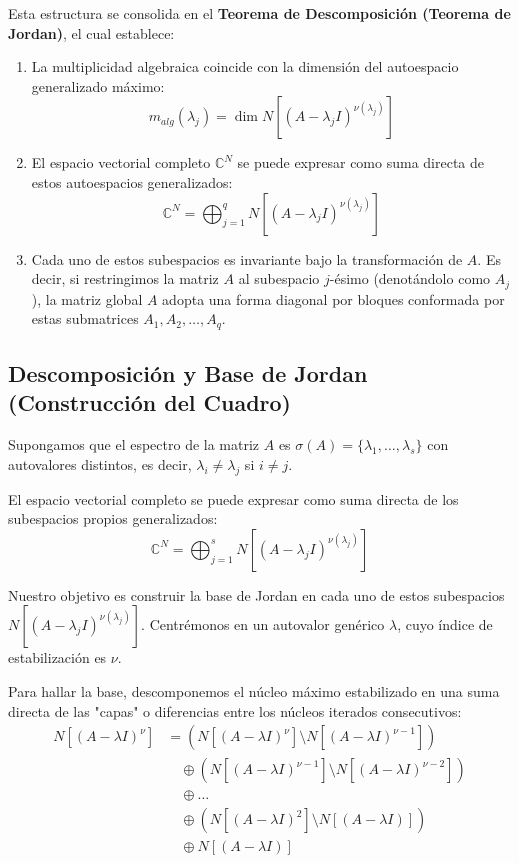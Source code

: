 Esta estructura se consolida en el \textbf{Teorema de Descomposición (Teorema de Jordan)}, el cual establece:
\begin{enumerate}
    \item La multiplicidad algebraica coincide con la dimensión del autoespacio generalizado máximo:
    \[
        m_{alg}(\lambda_j) = \dim N[(A-\lambda_j I)^{\nu(\lambda_j)}]
    \]
    
    \item El espacio vectorial completo $\mathbb{C}^N$ se puede expresar como suma directa de estos autoespacios generalizados:
    \[
        \mathbb{C}^N = \bigoplus_{j=1}^q N[(A-\lambda_j I)^{\nu(\lambda_j)}]
    \]
    
    \item Cada uno de estos subespacios es invariante bajo la transformación de $A$. Es decir, si restringimos la matriz $A$ al subespacio $j$-ésimo (denotándolo como $A_j$), la matriz global $A$ adopta una forma diagonal por bloques conformada por estas submatrices $A_1, A_2, \dots, A_q$.
\end{enumerate}
\subsection{Descomposición y Base de Jordan (Construcción del Cuadro)}

Supongamos que el espectro de la matriz $A$ es $\sigma(A)=\{\lambda_1, \dots, \lambda_s\}$ con autovalores distintos, es decir, $\lambda_i \neq \lambda_j$ si $i \neq j$. 

El espacio vectorial completo se puede expresar como suma directa de los subespacios propios generalizados:
\[
    \mathbb{C}^N = \bigoplus_{j=1}^s N[(A-\lambda_j I)^{\nu(\lambda_j)}]
\]

Nuestro objetivo es construir la base de Jordan en cada uno de estos subespacios $N[(A-\lambda_j I)^{\nu(\lambda_j)}]$. Centrémonos en un autovalor genérico $\lambda$, cuyo índice de estabilización es $\nu$.

Para hallar la base, descomponemos el núcleo máximo estabilizado en una suma directa de las "capas" o diferencias entre los núcleos iterados consecutivos:
\begin{align*}
    N[(A-\lambda I)^\nu] &= \left( N[(A-\lambda I)^\nu] \setminus N[(A-\lambda I)^{\nu-1}] \right) \\
    &\quad \oplus \left( N[(A-\lambda I)^{\nu-1}] \setminus N[(A-\lambda I)^{\nu-2}] \right) \\
    &\quad \oplus \dots \\
    &\quad \oplus \left( N[(A-\lambda I)^2] \setminus N[(A-\lambda I)] \right) \\
    &\quad \oplus N[(A-\lambda I)]
\end{align*}

